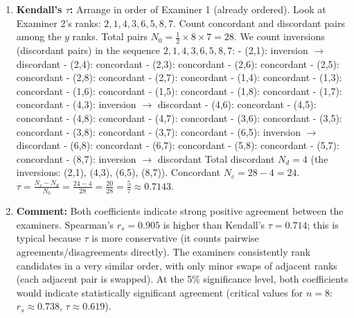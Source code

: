 \documentclass[11pt]{article}
\begin{document}
\begin{exoresolu}
\begin{enumerate}
\item \textbf{Kendall's $\tau$:} Arrange in order of Examiner 1 (already ordered). Look at Examiner 2's ranks: $2, 1, 4, 3, 6, 5, 8, 7$.
Count concordant and discordant pairs among the $y$ ranks. Total pairs $N_0 = \frac{1}{2} \times 8 \times 7 = 28$.
We count inversions (discordant pairs) in the sequence $2, 1, 4, 3, 6, 5, 8, 7$:
- (2,1): inversion $\to$ discordant
- (2,4): concordant
- (2,3): concordant
- (2,6): concordant
- (2,5): concordant
- (2,8): concordant
- (2,7): concordant
- (1,4): concordant
- (1,3): concordant
- (1,6): concordant
- (1,5): concordant
- (1,8): concordant
- (1,7): concordant
- (4,3): inversion $\to$ discordant
- (4,6): concordant
- (4,5): concordant
- (4,8): concordant
- (4,7): concordant
- (3,6): concordant
- (3,5): concordant
- (3,8): concordant
- (3,7): concordant
- (6,5): inversion $\to$ discordant
- (6,8): concordant
- (6,7): concordant
- (5,8): concordant
- (5,7): concordant
- (8,7): inversion $\to$ discordant
Total discordant $N_d = 4$ (the inversions: (2,1), (4,3), (6,5), (8,7)).
Concordant $N_c = 28 - 4 = 24$.
$\tau = \frac{N_c - N_d}{N_0} = \frac{24 - 4}{28} = \frac{20}{28} = \frac{5}{7} \approx 0.7143$.

\item \textbf{Comment:} Both coefficients indicate strong positive agreement between the examiners. Spearman's $r_s = 0.905$ is higher than Kendall's $\tau = 0.714$; this is typical because $\tau$ is more conservative (it counts pairwise agreements/disagreements directly). The examiners consistently rank candidates in a very similar order, with only minor swaps of adjacent ranks (each adjacent pair is swapped). At the 5\% significance level, both coefficients would indicate statistically significant agreement (critical values for $n=8$: $r_s \approx 0.738$, $\tau \approx 0.619$).
\end{enumerate}
\end{exoresolu}
\end{document}
